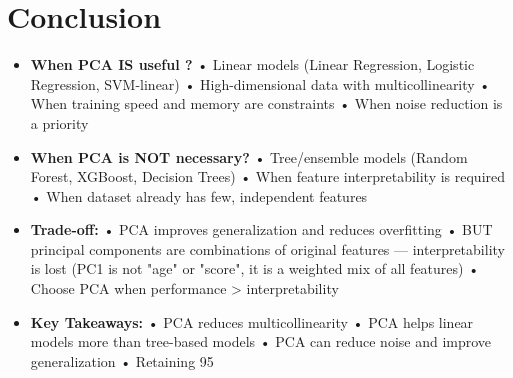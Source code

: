 \documentclass[11pt]{article}
\begin{document}
\section{Conclusion}
\begin{itemize}
\item \textbf{When PCA IS useful ?}
  • Linear models (Linear Regression, Logistic Regression, SVM-linear)
  • High-dimensional data with multicollinearity
  • When training speed and memory are constraints
  • When noise reduction is a priority
 
\item \textbf{When PCA is NOT necessary?}
  • Tree/ensemble models (Random Forest, XGBoost, Decision Trees)
  • When feature interpretability is required
  • When dataset already has few, independent features
 
\item \textbf{Trade-off:}
  • PCA improves generalization and reduces overfitting
  • BUT principal components are combinations of original features —
    interpretability is lost (PC1 is not "age" or "score", it is a
    weighted mix of all features)
  • Choose PCA when performance > interpretability
 
\item \textbf{Key Takeaways:}
  • PCA reduces multicollinearity
  • PCA helps linear models more than tree-based models
  • PCA can reduce noise and improve generalization
  • Retaining 95%
\end{itemize}
\end{document}
